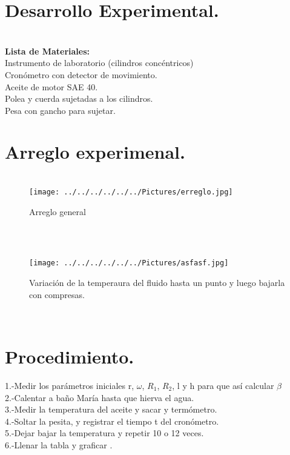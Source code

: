 \documentclass[10pt,a4paper]{article}
\begin{document}
\section*{Desarrollo Experimental.}\\
\textbf{Lista de Materiales:} \\
Instrumento de laboratorio (cilindros conc\'{e}ntricos)\\
Cron\'{o}metro con detector de movimiento. \\
Aceite de motor SAE 40. \\
Polea y cuerda sujetadas a los cilindros. \\
Pesa con gancho para sujetar.
\section*{Arreglo experimenal.}
\begin{figure}[hbtp]
\centering
\\
\texttt{[image: ../../../../../../Pictures/erreglo.jpg]} 
\caption{Arreglo general}
\end{figure} 
\\
\begin{figure}[hbtp]
\centering
\\
\texttt{[image: ../../../../../../Pictures/asfasf.jpg]} 
\caption{Variaci\'{o}n de la temperaura del fluido hasta un punto y luego bajarla con compresas.} 
\end{figure} 
\\
\pagebreak

\section*{Procedimiento.}
1.-Medir los par\'{a}metros iniciales r, $\omega$, ${R}_{1}$, ${R}_{2}$, l y h para que as\'{i} calcular $\beta$\\
2.-Calentar a ba\~{n}o Mar\'{i}a hasta que hierva el agua.\\
3.-Medir la temperatura del aceite y sacar y term\'{o}metro. \\
4.-Soltar la pesita, y registrar el tiempo t del cron\'{o}metro.\\
5.-Dejar bajar la temperatura y repetir 10 o 12 veces.\\
6.-Llenar la tabla y graficar  .\\
\end{document}
